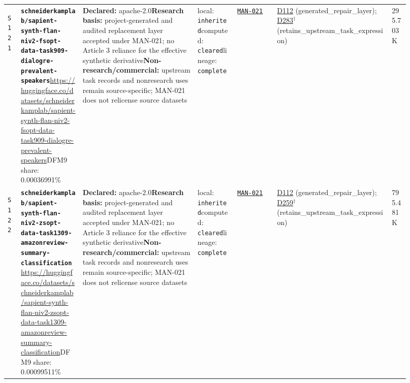 \documentclass[9pt,a4paper]{article}
\newcommand{\srcid}[1]{\hypertarget{src:#1}{\texttt{#1}}}
\begin{document}
\begin{landscape}
\begin{longtable}{@{}L{0.03\linewidth}L{0.14\linewidth}L{0.26\linewidth}L{0.09\linewidth}L{0.09\linewidth}L{0.265\linewidth}L{0.045\linewidth}@{}}
\srcid{S121} & \textbf{\nolinkurl{schneiderkamplab/sapient-synth-flan-niv2-fsopt-data-task909-dialogre-prevalent-speakers}}\newline \url{https://huggingface.co/datasets/schneiderkamplab/sapient-synth-flan-niv2-fsopt-data-task909-dialogre-prevalent-speakers}\newline DFM9 share: 0.00036991\% & \textbf{Declared:} apache-2.0\newline \textbf{Research basis:} project-generated and audited replacement layer accepted under MAN-021; no Article 3 reliance for the effective synthetic derivative\newline \textbf{Non-research/commercial:} upstream task records and nonresearch uses remain source-specific; MAN-021 does not relicense source datasets & local: \texttt{inherited}\newline computed: \texttt{cleared}\newline lineage: \texttt{complete} & \hyperlink{manual:MAN-021}{\texttt{MAN-021}} & \hyperlink{dep:D112}{D112} (generated\_repair\_layer); \hyperlink{dep:D283}{D283}$^{\dagger}$ (retains\_upstream\_task\_expression) & 295.703K \\
\srcid{S122} & \textbf{\nolinkurl{schneiderkamplab/sapient-synth-flan-niv2-zsopt-data-task1309-amazonreview-summary-classification}}\newline \url{https://huggingface.co/datasets/schneiderkamplab/sapient-synth-flan-niv2-zsopt-data-task1309-amazonreview-summary-classification}\newline DFM9 share: 0.00099511\% & \textbf{Declared:} apache-2.0\newline \textbf{Research basis:} project-generated and audited replacement layer accepted under MAN-021; no Article 3 reliance for the effective synthetic derivative\newline \textbf{Non-research/commercial:} upstream task records and nonresearch uses remain source-specific; MAN-021 does not relicense source datasets & local: \texttt{inherited}\newline computed: \texttt{cleared}\newline lineage: \texttt{complete} & \hyperlink{manual:MAN-021}{\texttt{MAN-021}} & \hyperlink{dep:D112}{D112} (generated\_repair\_layer); \hyperlink{dep:D259}{D259}$^{\dagger}$ (retains\_upstream\_task\_expression) & 795.481K \\

\end{longtable}
\end{landscape}
\end{document}
